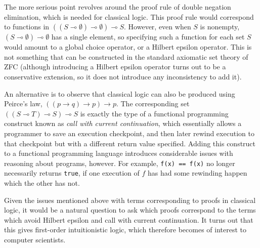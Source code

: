 \documentclass{article}
\theoremstyle{definition}
\begin{document}
	The more serious point revolves around the proof rule of double negation elimination, which is needed for classical logic.  This proof rule would correspond to functions in $((S \multimap \emptyset) \multimap \emptyset) \multimap S$.  However, even when $S$ is nonempty, $(S\multimap\emptyset)\multimap\emptyset$ has a single element, so specifying such a function for each set $S$ would amount to a global choice operator, or a Hilbert epsilon operator.  This is not something that can be constructed in the standard axiomatic set theory of ZFC (although introducing a Hilbert epsilon operator turns out to be a conservative extension, so it does not introduce any inconsistency to add it).
	
	An alternative is to observe that classical logic can also be produced using Peirce's law, $((p \rightarrow q) \rightarrow p) \rightarrow p$.  The corresponding set $((S \multimap T) \multimap S) \multimap S$ is exactly the type of a functional programming construct known as {\em call with current continuation}, which essentially allows a programmer to save an execution checkpoint, and then later rewind execution to that checkpoint but with a different return value specified.  Adding this construct to a functional programming language introduces considerable issues with reasoning about programs, however.  For example, {\tt f(x) == f(x)} no longer necessarily returns {\tt true}, if one execution of $f$ has had some rewinding happen which the other has not.
	
	Given the issues mentioned above with terms corresponding to proofs in classical logic, it would be a natural question to ask which proofs correspond to the terms which avoid Hilbert epsilon and call with current continuation.  It turns out that this gives first-order intuitionistic logic, which therefore becomes of interest to computer scientists.
\end{document}
